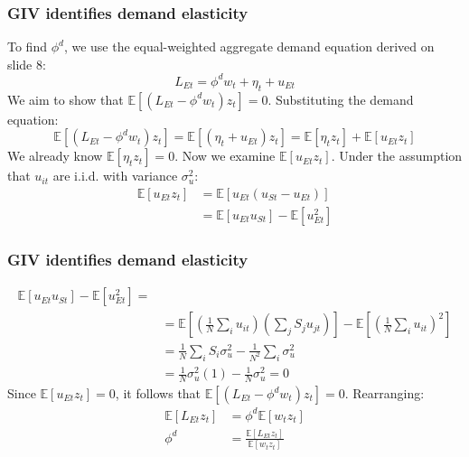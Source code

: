 \documentclass[aspectratio=169,11pt]{beamer}
\begin{document}
\begin{frame}
    \frametitle{GIV identifies demand elasticity}
    To find $\phi^d$, we use the equal-weighted aggregate demand equation derived on slide 8:
    \begin{equation}
        L_{Et} = \phi^d w_t + \eta_t + u_{Et} \tag{41}
    \end{equation}
    We aim to show that $\mathbb{E}[(L_{Et} - \phi^d w_t) z_t] = 0$. Substituting the demand equation:
    \begin{equation}
        \mathbb{E}[(L_{Et} - \phi^d w_t) z_t] = \mathbb{E}[(\eta_t + u_{Et}) z_t] = \mathbb{E}[\eta_t z_t] + \mathbb{E}[u_{Et} z_t]
    \end{equation}
    We already know $\mathbb{E}[\eta_t z_t] = 0$. Now we examine $\mathbb{E}[u_{Et} z_t]$. Under the assumption that $u_{it}$ are i.i.d. with variance $\sigma_u^2$:
    \begin{align*}
        \mathbb{E}[u_{Et} z_t] & = \mathbb{E}[u_{Et} (u_{St} - u_{Et})]             \\
                               & = \mathbb{E}[u_{Et} u_{St}] - \mathbb{E}[u_{Et}^2]
    \end{align*}
    \vspace{0.1cm}
    \hfill \hyperlink{src_psi_identification}{}
\end{frame}

\begin{frame}
    \frametitle{GIV identifies demand elasticity}
    \begin{align*}
        \mathbb{E}[u_{Et} u_{St}] - \mathbb{E}[u_{Et}^2]    =
        \\
         & = \mathbb{E} \left[ \left( \frac{1}{N} \sum_{i} u_{it} \right) \left( \sum_{j} S_j u_{jt} \right) \right] - \mathbb{E} \left[ \left( \frac{1}{N} \sum_{i} u_{it} \right)^2 \right] \\
         & = \frac{1}{N} \sum_{i} S_i \sigma_u^2 - \frac{1}{N^2} \sum_{i} \sigma_u^2                                                                                                          \\
         & = \frac{1}{N} \sigma_u^2 (1) - \frac{1}{N} \sigma_u^2 = 0
    \end{align*}
    Since $\mathbb{E}[u_{Et} z_t] = 0$, it follows that $\mathbb{E}[(L_{Et} - \phi^d w_t) z_t] = 0$. Rearranging:
    \begin{align*}
        \mathbb{E}[L_{Et} z_t] & = \phi^d \mathbb{E}[w_t z_t]                         \\
        \phi^d                 & = \frac{\mathbb{E}[L_{Et} z_t]}{\mathbb{E}[w_t z_t]}
    \end{align*}
    \vspace{0.1cm}
    \hfill
\end{frame}
\end{document}
